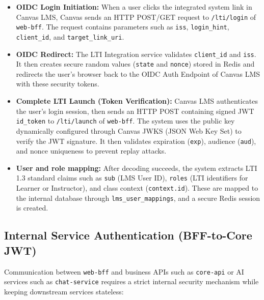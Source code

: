 \begin{itemize}
    \item \textbf{OIDC Login Initiation:} When a user clicks the integrated
          system link in Canvas LMS, Canvas sends an HTTP POST/GET request
          to \texttt{/lti/login} of \texttt{web-bff}. The request contains
          parameters such as \texttt{iss}, \texttt{login\_hint},
          \texttt{client\_id}, and \texttt{target\_link\_uri}.
    \item \textbf{OIDC Redirect:} The LTI Integration service validates
          \texttt{client\_id} and \texttt{iss}. It then creates secure
          random values (\texttt{state} and \texttt{nonce}) stored in
          Redis and redirects the user's browser back to the OIDC Auth
          Endpoint of Canvas LMS with these security tokens.
    \item \textbf{Complete LTI Launch (Token Verification):} Canvas LMS
          authenticates the user's login session, then sends an HTTP POST
          containing signed JWT \texttt{id\_token} to
          \texttt{/lti/launch} of \texttt{web-bff}. The system uses the
          public key dynamically configured through Canvas JWKS (JSON Web
          Key Set) to verify the JWT signature. It then validates
          expiration (\texttt{exp}), audience (\texttt{aud}), and nonce
          uniqueness to prevent replay attacks.
    \item \textbf{User and role mapping:} After decoding succeeds, the
          system extracts LTI 1.3 standard claims such as \texttt{sub}
          (LMS User ID), \texttt{roles} (LTI identifiers for Learner or
          Instructor), and class context (\texttt{context.id}). These are
          mapped to the internal database through
          \texttt{lms\_user\_mappings}, and a secure Redis session is
          created.
\end{itemize}

\subsection{Internal Service Authentication (BFF-to-Core JWT)}
\label{subsec:internal-jwt}

Communication between \texttt{web-bff} and business APIs such as
\texttt{core-api} or AI services such as \texttt{chat-service} requires a
strict internal security mechanism while keeping downstream services
stateless:

